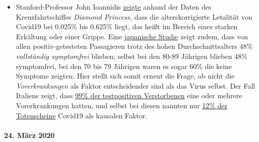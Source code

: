 \begin{itemize}
\item
  Stanford-Professor John Ioannidis
  \href{https://www.statnews.com/2020/03/17/a-fiasco-in-the-making-as-the-coronavirus-pandemic-takes-hold-we-are-making-decisions-without-reliable-data/}{zeigte}
  anhand der Daten des Kreuzfahrtschiffes \emph{Diamond Princess,} dass
  die alterskorrigierte Letalität von Covid19 bei 0.025\% bis 0.625\%
  liegt, das heißt im Bereich einer starken Erkältung oder einer Grippe.
  Eine
  \href{https://www.niid.go.jp/niid/en/2019-ncov-e/9407-covid-dp-fe-01.html}{japanische
  Studie} zeigt zudem, dass von allen positiv-getesteten Passagieren
  trotz des hohen Durch­schnitts­alters 48\% \emph{vollständig
  symptomfrei} blieben; selbst bei den 80-89 Jährigen blieben 48\%
  symptomfrei, bei den 70 bis 79 Jährigen waren es sogar 60\% die keine
  Symptome zeigten. Hier stellt sich somit erneut die Frage, ob nicht
  die \emph{Vorerkrankungen} als Faktor entscheidender sind als das
  Virus selbst. Der Fall Italiens zeigt, dass
  \href{https://www.bloomberg.com/news/articles/2020-03-18/99-of-those-who-died-from-virus-had-other-illness-italy-says}{99\%
  der testpositiven Verstorbenen} eine oder mehrere Vorerkrankungen
  hatten, und selbst bei diesen nannten nur
  \href{https://web.archive.org/web/20200324214448/https://www.telegraph.co.uk/global-health/science-and-disease/have-many-coronavirus-patients-died-italy/}{12\%
  der Totenscheine} Covid19 als kausalen Faktor.
\end{itemize}

\hypertarget{24-muxe4rz-2020}{%
\paragraph{24. März 2020}\label{24-muxe4rz-2020}}

